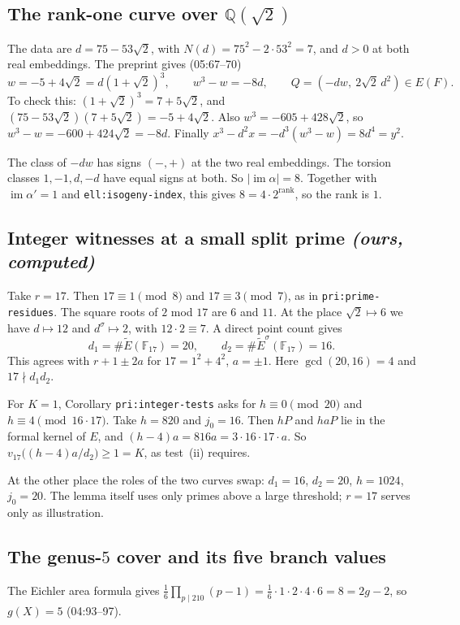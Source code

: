 \documentclass[11pt]{article}
\theoremstyle{definition}
\newcommand{\Q}{\mathbb Q}
\newcommand{\F}{\mathbb F}
\newcommand{\lbl}[1]{\texttt{#1}}
\newcommand{\src}[1]{\textsf{#1}}
\DeclareMathOperator{\rank}{rank}
\begin{document}
\subsection{The rank-one curve over $\Q(\sqrt2)$}
The data are $d=75-53\sqrt2$, with $N(d)=75^2-2\cdot53^2=7$, and $d>0$ at
both real embeddings.  The preprint gives (\src{05:67--70})
\[
 w=-5+4\sqrt2=d(1+\sqrt2)^3,\qquad w^3-w=-8d,\qquad
 Q=(-dw,\ 2\sqrt2\,d^2)\in E(F).
\]
To check this: $(1+\sqrt2)^3=7+5\sqrt2$, and $(75-53\sqrt2)(7+5\sqrt2)=-5+4\sqrt2$.
Also $w^3=-605+428\sqrt2$, so $w^3-w=-600+424\sqrt2=-8d$.  Finally
$x^3-d^2x=-d^3(w^3-w)=8d^4=y^2$.

The class of $-dw$ has signs $(-,+)$ at the two real embeddings.  The
torsion classes $1,-1,d,-d$ have equal signs at both.  So
$|\operatorname{im}\alpha|=8$.  Together with $\operatorname{im}\alpha'=1$
and \lbl{ell:isogeny-index}, this gives $8=4\cdot2^{\rank}$, so the rank
is $1$.

\subsection{Integer witnesses at a small split prime \emph{(ours, computed)}}
Take $r=17$.  Then $17\equiv1\pmod8$ and $17\equiv3\pmod7$, as in
\lbl{pri:prime-residues}.  The square roots of $2$ mod $17$ are $6$ and
$11$.  At the place $\sqrt2\mapsto6$ we have $d\mapsto12$ and
$d^\sigma\mapsto2$, with $12\cdot2\equiv7$.  A direct point count gives
\[
 d_1=\#\widetilde E(\F_{17})=20,\qquad d_2=\#\widetilde E^\sigma(\F_{17})=16.
\]
This agrees with $r+1\pm2a$ for $17=1^2+4^2$, $a=\pm1$.  Here
$\gcd(20,16)=4$ and $17\nmid d_1d_2$.

For $K=1$, Corollary \lbl{pri:integer-tests} asks for
$h\equiv0\pmod{20}$ and $h\equiv4\pmod{16\cdot17}$.  Take $h=820$ and
$j_0=16$.  Then $hP$ and $haP$ lie in the formal kernel of $E$, and
$(h-4)a=816a=3\cdot16\cdot17\cdot a$.  So
$v_{17}\bigl((h-4)a/d_2\bigr)\ge1=K$, as test~(ii) requires.

At the other place the roles of the two curves swap: $d_1=16$, $d_2=20$,
$h=1024$, $j_0=20$.  The lemma itself uses only primes above a large
threshold; $r=17$ serves only as illustration.

\subsection{The genus-$5$ cover and its five branch values}\label{toy:rh}
The Eichler area formula gives
$\frac16\prod_{p\mid210}(p-1)=\frac16\cdot1\cdot2\cdot4\cdot6=8=2g-2$,
so $g(X)=5$ (\src{04:93--97}).
\end{document}
